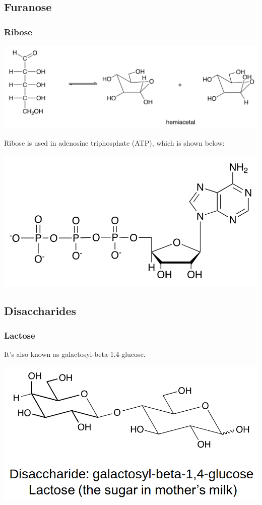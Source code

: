 \documentclass[11pt]{article}
\begin{document}
\newpage

\subsection{Furanose}
\label{sec:org5d30b4e}

\subsubsection{Ribose}
\label{sec:orgbdd4eef}
\begin{center}
\includegraphics[width=.9\linewidth]{./images/ribose.png}
\end{center}

Ribose is used in adenosine triphosphate (ATP), which is shown below:
\begin{center}
\includegraphics[width=.9\linewidth]{./images/atp.png}
\end{center}

\newpage

\subsection{Disaccharides}
\label{sec:org0f038a9}

\subsubsection{Lactose}
\label{sec:org9721c0d}
It's also known as galactosyl-beta-1,4-glucose.
\begin{center}
\includegraphics[width=.9\linewidth]{./images/lactose.png}
\end{center}
\end{document}
